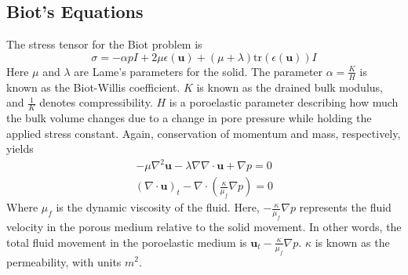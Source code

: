 \subsection{Biot's Equations}
The stress tensor for the Biot problem is 
\[ \sigma = -\alpha pI + 2\mu \epsilon(\mathbf{u}) + (\mu + \lambda)\text{tr}(\epsilon(\mathbf{u}))I  \]
Here $\mu$ and $\lambda$ are Lame's parameters for the solid. The parameter $\alpha = \frac{K}{H}$ is known as the Biot-Willis coefficient. $K$ is known as the drained bulk modulus, and $\frac{1}{K}$ denotes compressibility. $H$ is a poroelastic parameter describing how much the bulk volume changes due to a change in pore pressure while holding the applied stress constant. Again, conservation of momentum and mass, respectively, yields
\begin{align}
	 - \mu \nabla ^2 \mathbf{u}
	 - \lambda \nabla \nabla \cdot \mathbf{u}
	 + \nabla p = 0 \label{MomentumS}
\end{align}
\begin{align}
	 (\nabla \cdot \mathbf{u})_t
	 - \nabla \cdot (\frac{\kappa}{\mu_f} \nabla p) 
	 = 0 \label{ContinuityS}
\end{align}
Where $\mu_f$ is the dynamic viscosity of the fluid. Here, $-\frac{\kappa}{\mu_f} \nabla p$ represents the fluid velocity in the porous medium relative to the solid movement. In other words, the total fluid movement in the poroelastic medium is $\mathbf{u}_t - \frac{\kappa}{\mu_f} \nabla p$. $\kappa$ is known as the permeability, with units $m^2$.



